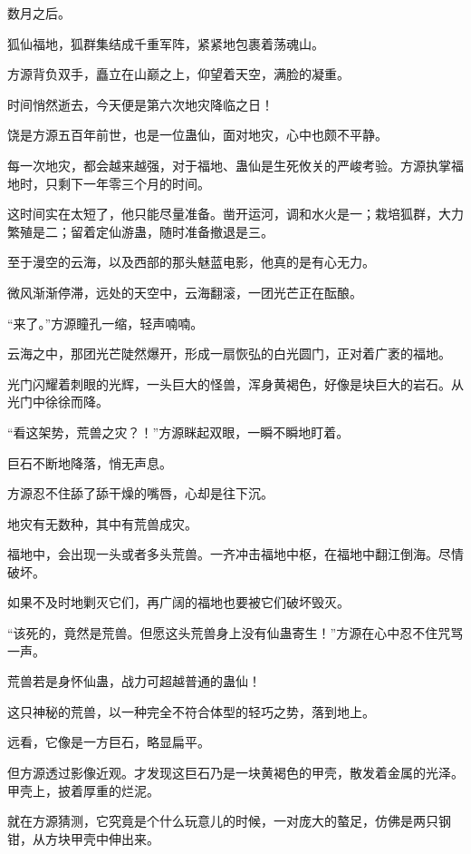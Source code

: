 
\begin{this_body}

数月之后。

狐仙福地，狐群集结成千重军阵，紧紧地包裹着荡魂山。

方源背负双手，矗立在山巅之上，仰望着天空，满脸的凝重。

时间悄然逝去，今天便是第六次地灾降临之日！

饶是方源五百年前世，也是一位蛊仙，面对地灾，心中也颇不平静。

每一次地灾，都会越来越强，对于福地、蛊仙是生死攸关的严峻考验。方源执掌福地时，只剩下一年零三个月的时间。

这时间实在太短了，他只能尽量准备。凿开运河，调和水火是一；栽培狐群，大力繁殖是二；留着定仙游蛊，随时准备撤退是三。

至于漫空的云海，以及西部的那头魅蓝电影，他真的是有心无力。

微风渐渐停滞，远处的天空中，云海翻滚，一团光芒正在酝酿。

“来了。”方源瞳孔一缩，轻声喃喃。

云海之中，那团光芒陡然爆开，形成一扇恢弘的白光圆门，正对着广袤的福地。

光门闪耀着刺眼的光辉，一头巨大的怪兽，浑身黄褐色，好像是块巨大的岩石。从光门中徐徐而降。

“看这架势，荒兽之灾？！”方源眯起双眼，一瞬不瞬地盯着。

巨石不断地降落，悄无声息。

方源忍不住舔了舔干燥的嘴唇，心却是往下沉。

地灾有无数种，其中有荒兽成灾。

福地中，会出现一头或者多头荒兽。一齐冲击福地中枢，在福地中翻江倒海。尽情破坏。

如果不及时地剿灭它们，再广阔的福地也要被它们破坏毁灭。

“该死的，竟然是荒兽。但愿这头荒兽身上没有仙蛊寄生！”方源在心中忍不住咒骂一声。

荒兽若是身怀仙蛊，战力可超越普通的蛊仙！

这只神秘的荒兽，以一种完全不符合体型的轻巧之势，落到地上。

远看，它像是一方巨石，略显扁平。

但方源透过影像近观。才发现这巨石乃是一块黄褐色的甲壳，散发着金属的光泽。甲壳上，披着厚重的烂泥。

就在方源猜测，它究竟是个什么玩意儿的时候，一对庞大的螯足，仿佛是两只钢钳，从方块甲壳中伸出来。


\end{this_body}
